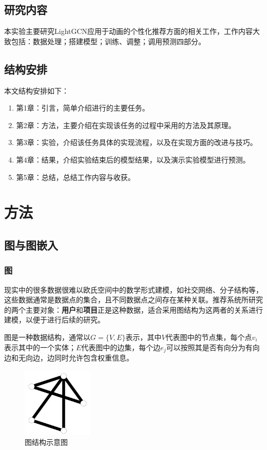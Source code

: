 \documentclass[hyperref,a4paper,UTF8]{ctexart}
\begin{document}
\subsection{研究内容}
本实验主要研究LightGCN应用于动画的个性化推荐方面的相关工作，工作内容大致包括：数据处理；搭建模型；训练、调整；调用预测四部分。
\subsection{结构安排}

本文结构安排如下：
\begin{enumerate}
    \item 第1章：引言，简单介绍进行的主要任务。
    \item 第2章：方法，主要介绍在实现该任务的过程中采用的方法及其原理。
    \item 第3章：实验，介绍该任务具体的实现流程，以及在实现方面的改进与技巧。
    \item 第4章：结果，介绍实验结束后的模型结果，以及演示实验模型进行预测。
    \item 第5章：总结，总结工作内容与收获。
\end{enumerate}


\section{方法}

\subsection{图与图嵌入}

\subsubsection{图}
现实中的很多数据很难以欧氏空间中的数学形式建模，如社交网络、分子结构等，这些数据通常是数据点的集合，且不同数据点之间存在某种关联。推荐系统所研究的两个主要对象：\textbf{用户}和\textbf{项目}正是这种数据，适合采用图结构为这两者的关系进行建模，以便于进行后续的研究。

图是一种数据结构，通常以$G=\{V,E\}$表示，其中$V$代表图中的节点集，每个点$v_i$表示其中的一个实体；$E$代表图中的边集，每个边$e_j$可以按照其是否有向分为有向边和无向边，边同时允许包含权重信息。

\begin{figure}[ht]
    \centering
    \includegraphics[width=0.3\textwidth]{fig/graph.jpg}
    \caption{图结构示意图}
    \label{fig:graph}
\end{figure}
\end{document}

